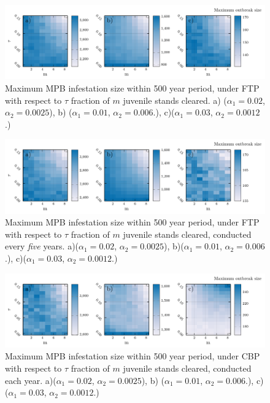 

\begin{figure}
    \includegraphics[width=\textwidth]{appendices/data_base_fig.pdf}
    \caption{Maximum MPB infestation size within 500 year period, under FTP with respect to $\tau$ fraction of $m$ juvenile stands cleared. a) ($\alpha_1 = 0.02$, $\alpha_2 = 0.0025$), b) ($\alpha_1 = 0.01$, $\alpha_2 = 0.006$.), c)($\alpha_1 = 0.03$, $\alpha_2 = 0.0012$.)}
    \label{beetle_pop_yearly}
  \end{figure}
  
  \begin{figure}
    \includegraphics[width=\textwidth]{appendices/data_five_year_trim_fig.pdf}
    \caption{Maximum MPB infestation size within 500 year period, under FTP with respect to $\tau$ fraction of $m$ juvenile stands cleared, conducted every \emph{five} years. a)($\alpha_1 = 0.02$, $\alpha_2 = 0.0025$), b)($\alpha_1 = 0.01$, $\alpha_2 = 0.006$.), c)($\alpha_1 = 0.03$, $\alpha_2 = 0.0012$.)}
    \label{beetle_pop_five_years}
  \end{figure}
  
  \begin{figure}
    \includegraphics[width=\textwidth]{appendices/data_yearly_burn_fig.pdf}
    \caption{Maximum MPB infestation size within 500 year period, under CBP with respect to $\tau$ fraction of $m$ juvenile stands cleared, conducted each year. a)($\alpha_1 = 0.02$, $\alpha_2 = 0.0025$), b) ($\alpha_1 = 0.01$, $\alpha_2 = 0.006$.), c) ($\alpha_1 = 0.03$, $\alpha_2 = 0.0012$.)}
    \label{CBP_five_years}
  \end{figure}

